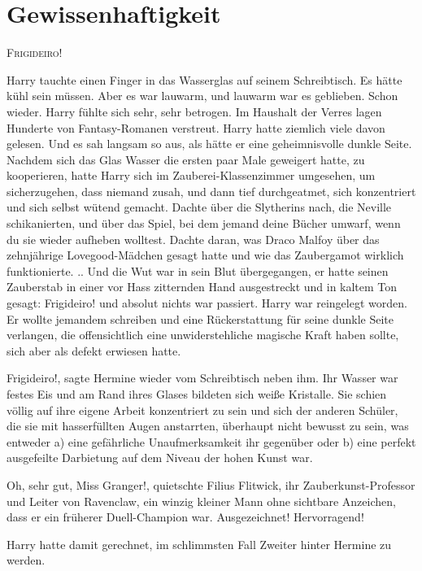 \chapter{Gewissenhaftigkeit}

\lettrine{\loq F}{rigideiro}!\grqq{}

Harry tauchte einen Finger in das Wasserglas auf seinem Schreibtisch. Es hätte
kühl sein müssen. Aber es war lauwarm, und lauwarm war es geblieben. Schon
wieder. Harry fühlte sich sehr, sehr betrogen. Im Haushalt der Verres lagen
Hunderte von Fantasy-Romanen verstreut. Harry hatte ziemlich viele davon
gelesen. Und es sah langsam so aus, als hätte er eine geheimnisvolle dunkle
Seite. Nachdem sich das Glas Wasser die ersten paar Male geweigert hatte, zu
kooperieren, hatte Harry sich im Zauberei-Klassenzimmer umgesehen, um
sicherzugehen, dass niemand zusah, und dann tief durchgeatmet, sich konzentriert
und sich selbst wütend gemacht. Dachte über die Slytherins nach, die Neville
schikanierten, und über das Spiel, bei dem jemand deine Bücher umwarf, wenn du
sie wieder aufheben wolltest. Dachte daran, was Draco Malfoy über das
zehnjährige Lovegood-Mädchen gesagt hatte und wie das Zaubergamot wirklich
funktionierte. .. Und die Wut war in sein Blut übergegangen, er hatte seinen
Zauberstab in einer vor Hass zitternden Hand ausgestreckt und in kaltem Ton
gesagt: \glqq{}Frigideiro!\grqq{} und absolut nichts war passiert. Harry war
reingelegt worden. Er wollte jemandem schreiben und eine Rückerstattung für
seine dunkle Seite verlangen, die offensichtlich eine unwiderstehliche magische
Kraft haben sollte, sich aber als defekt erwiesen hatte.

\glqq{}Frigideiro!\grqq{}, sagte Hermine wieder vom Schreibtisch neben ihm. Ihr
Wasser war festes Eis und am Rand ihres Glases bildeten sich weiße Kristalle.
Sie schien völlig auf ihre eigene Arbeit konzentriert zu sein und sich der
anderen Schüler, die sie mit hasserfüllten Augen anstarrten, überhaupt nicht
bewusst zu sein, was entweder a) eine gefährliche Unaufmerksamkeit ihr gegenüber
oder b) eine perfekt ausgefeilte Darbietung auf dem Niveau der hohen Kunst war.

\glqq{}Oh, sehr gut, Miss Granger!\grqq{}, quietschte Filius Flitwick, ihr
Zauberkunst-Professor und Leiter von Ravenclaw, ein winzig kleiner Mann ohne
sichtbare Anzeichen, dass er ein früherer Duell-Champion war. \glqq
Ausgezeichnet! Hervorragend!\grqq{}

Harry hatte damit gerechnet, im schlimmsten Fall Zweiter hinter Hermine zu
werden.

